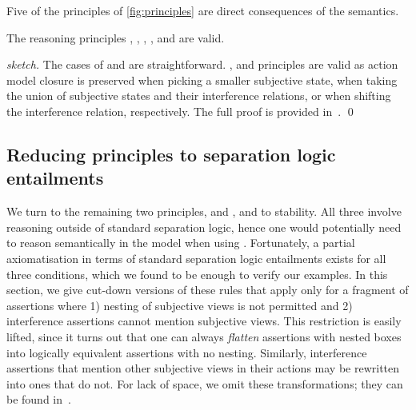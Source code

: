 Five of the principles of \fig\ref{fig:principles} are direct
consequences of the semantics.

\begin{lemma}
  \label{lem:assertion-facts}
  The \colosl reasoning principles 
  \forgetRule, \mergeRule, \shiftRule, \weakenRule, and \copyRule are valid.
\end{lemma}
\begin{proof}[sketch]
  The cases of \weakenRule and \copyRule are
  straightforward. \forgetRule, \mergeRule and \shiftRule principles are valid as action
  model closure is preserved when picking a smaller subjective state, when taking the union of subjective states and their interference relations, or when shifting the interference relation, respectively. The full proof is provided in~\cite{colosl-tr14}.
  \qed
\end{proof}


\subsection{Reducing \colosl principles to separation logic entailments}
\label{subsec:prules}

We turn to the remaining two principles, \extendRule and \shiftRule,
and to stability. All three involve reasoning outside of standard
separation logic, hence one would potentially need to reason
semantically in the model when using \colosl. Fortunately, a partial
axiomatisation in terms of standard separation logic entailments
exists for all three conditions, which we found to be enough to verify
our examples. In this section, we give cut-down versions of these
rules that apply only for a fragment of \colosl assertions where 1)
nesting of subjective views is not permitted and 2) interference
assertions cannot mention subjective views. This restriction is easily
lifted, since it turns out that one can always \emph{flatten}
assertions with nested boxes into logically equivalent assertions with
no nesting. Similarly, interference assertions that mention other
subjective views in their actions may be rewritten into ones
that do not. For lack of space, we omit these transformations; they
can be found in~\cite{colosl-tr14}.%

